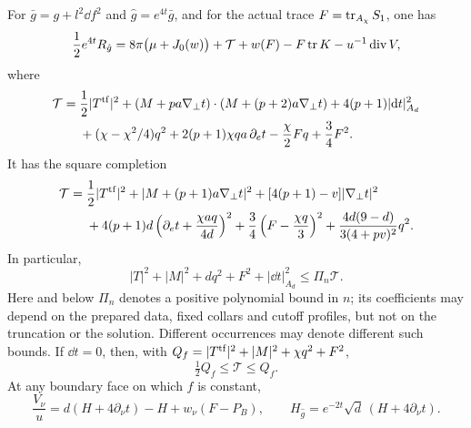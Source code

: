 \begin{lemma}\label{d:identities}
For $\bar g=g+l^2\dd f^2$ and $\hat g=e^{4t}\bar g$, and for the
actual trace $F=\operatorname{tr}_{A_\chi}S_1$, one has
\begin{equation}\label{d:curvature}
 \frac12e^{4t}R_{\hat g}
 =8\pi\bigl(\mu+J_0(w)\bigr)+\mathcal T+w(F)-F\operatorname{tr} K
       -u^{-1}\operatorname{div} V,
\end{equation}
where
\begin{align}\label{d:quadratic}
 \mathcal T={}&\frac12|T^{\rm tf}|^2
 +(M+pa\nabla_\perp t)\cdot(M+(p+2)a\nabla_\perp t)
 +4(p+1)|\mathrm d t|_{A_d}^2\notag\\
 &+(\chi-\chi^2/4)q^2+2(p+1)\chi qa\,\partial_et
       -\frac\chi2Fq+\frac34F^2.
\end{align}
It has the square completion
\begin{align}\label{d:squares}
 \mathcal T={}&\frac12|T^{\rm tf}|^2
  +|M+(p+1)a\nabla_\perp t|^2
  +[4(p+1)-v]|\nabla_\perp t|^2\notag\\
 &+4(p+1)d\left(\partial_et+\frac{\chi aq}{4d}\right)^2
  +\frac34\left(F-\frac{\chi q}{3}\right)^2
  +\frac{4d(9-d)}{3(4+pv)^2}q^2.
\end{align}
In particular,
\begin{equation}\label{d:coercivity}
 |T|^2+|M|^2+dq^2+F^2+|\dd t|_{A_d}^2
       \le\Pi_n\mathcal T.
\end{equation}
Here and below $\Pi_n$ denotes a positive polynomial bound in $n$;
its coefficients may depend on the prepared data, fixed collars and
cutoff profiles, but not on the truncation or the solution.  Different
occurrences may denote different such bounds.  If $\dd t=0$, then,
with $Q_f=|T^{\rm tf}|^2+|M|^2+\chi q^2+F^2$,
\begin{equation}\label{d:floor-norm}
 \tfrac12Q_f\le\mathcal T\le Q_f.
\end{equation}
At any boundary face on which $f$ is constant,
\begin{equation}\label{d:boundary-identity}
 \frac{V_\nu}{u}
 =d(H+4\partial_\nu t)-H+w_\nu(F-P_B),\qquad
 H_{\hat g}=e^{-2t}\sqrt d\,(H+4\partial_\nu t).
\end{equation}
\end{lemma}
